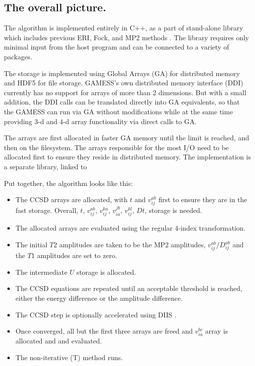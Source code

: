 \documentclass[12pt]{article} \usepackage[margin=1in]{geometry}
\begin{document}
\subsection{The overall picture.}
The algorithm is implemented entirely in C++, as a part of stand-alone
library which includes previous ERI, Fock, and MP2 methods
\cite{asadchev2010uncontracted,asadchev}.
The library requires only minimal input from the host program and can
be connected to a variety of packages.

The storage is implemented using Global Arrays (GA) \cite{ga} for
distributed memory and HDF5 \cite{hdf5} for file storage.  GAMESS's
own distributed memory interface (DDI) \cite{ddi} currently has no
support for arrays of more than 2 dimensions.  But with a small
addition, the DDI calls can be translated directly into GA
equivalents, so that the GAMESS can run via GA without modifications
while at the same time providing 3-d and 4-d array functionality via
direct calls to GA.

 The arrays are first allocated in faster GA memory until the limit is reached,
and then on the filesystem.  The arrays responsible for the most I/O
need to be allocated first to ensure they reside in distributed
memory.  The implementation is a separate library, linked to

Put together, the algorithm looks like this:
\begin{itemize}
\item{The CCSD arrays are allocated, with $t$ and $v_{ij}^{ab}$ first
  to ensure they are in the fast storage.  Overall, $t$,
  $v_{ij}^{ab}$, $v_{ij}^{ka}$, $v_{ia}^{jb}$, $v_{ij}^{kl}$, $Dt$,
  storage is needed.}
\item{The allocated arrays are evaluated using the regular 4-index
    transformation.}
\item{The initial $T2$ amplitudes are taken to be the MP2 amplitudes,
 $v_{ij}^{ab}/D_{ij}^{ab}$ and the $T1$ amplitudes are set to zero.}
\item{The intermediate $U$ storage is allocated.}
\item{The CCSD  equations are repeated until an acceptable threshold
    is reached, either the energy difference or the amplitude
    difference.}
\item{The CCSD step is optionally accelerated using DIIS
    \cite{scuseria1986accelerating}.}
\item{Once converged, all but the first three arrays are freed and
    $v_{ia}^{bc}$ array is allocated and and evaluated.}
\item{The non-iterative (T) method runs.}
\end{itemize}
\end{document}
